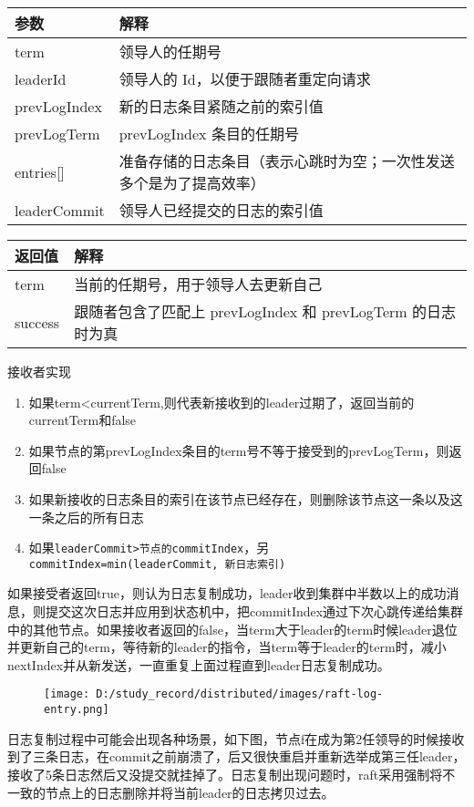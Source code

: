 \documentclass[
]{article}
\begin{document}
\begin{longtable}[]{@{}ll@{}}
\toprule
参数 & 解释\tabularnewline
\midrule
\endhead
term & 领导人的任期号\tabularnewline
leaderId & 领导人的 Id，以便于跟随者重定向请求\tabularnewline
prevLogIndex & 新的日志条目紧随之前的索引值\tabularnewline
prevLogTerm & prevLogIndex 条目的任期号\tabularnewline
entries{[}{]} &
准备存储的日志条目（表示心跳时为空；一次性发送多个是为了提高效率）\tabularnewline
leaderCommit & 领导人已经提交的日志的索引值\tabularnewline
\bottomrule
\end{longtable}

\begin{longtable}[]{@{}ll@{}}
\toprule
返回值 & 解释\tabularnewline
\midrule
\endhead
term & 当前的任期号，用于领导人去更新自己\tabularnewline
success & 跟随者包含了匹配上 prevLogIndex 和 prevLogTerm
的日志时为真\tabularnewline
\bottomrule
\end{longtable}

接收者实现

\begin{enumerate}
\def\labelenumi{\arabic{enumi}.}
\item
  如果term\textless currentTerm,则代表新接收到的leader过期了，返回当前的currentTerm和false
\item
  如果节点的第prevLogIndex条目的term号不等于接受到的prevLogTerm，则返回false
\item
  如果新接收的日志条目的索引在该节点已经存在，则删除该节点这一条以及这一条之后的所有日志
\item
  如果\texttt{leaderCommit\textgreater{}节点的commitIndex}，另\texttt{commitIndex=min(leaderCommit,\ 新日志索引)}
\end{enumerate}

如果接受者返回true，则认为日志复制成功，leader收到集群中半数以上的成功消息，则提交这次日志并应用到状态机中，把commitIndex通过下次心跳传递给集群中的其他节点。如果接收者返回的false，当term大于leader的term时候leader退位并更新自己的term，等待新的leader的指令，当term等于leader的term时，减小nextIndex并从新发送，一直重复上面过程直到leader日志复制成功。

\begin{figure}
\centering
\texttt{[image: D:/study\_record/distributed/images/raft-log-entry.png]}
\caption{}
\end{figure}

日志复制过程中可能会出现各种场景，如下图，节点f在成为第2任领导的时候接收到了三条日志，在commit之前崩溃了，后又很快重启并重新选举成第三任leader，接收了5条日志然后又没提交就挂掉了。日志复制出现问题时，raft采用强制将不一致的节点上的日志删除并将当前leader的日志拷贝过去。
\end{document}
